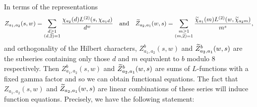     In terms of the representations
    \[
        Z_{a_{1},a_{2}}(s,w) = \sum_{\substack{d \ge 1 \\ (d,2) = 1}}\frac{\chi_{a_{2}}(d)L^{(2)}(s,\chi_{a_{1}d})}{d^{w}} \quad \text{and} \quad \widetilde{Z}_{a_{2},a_{1}}(w,s) = \sum_{\substack{m \ge 1 \\ (m,2) = 1}}\frac{\widetilde{\chi}_{a_{1}}(m)L^{(2)}(w,\widetilde{\chi}_{a_{2}m})}{m^{s}},
    \]
    and orthogonality of the Hilbert characters, $Z_{a_{1},a_{2}}^{b}(s,w)$ and $\widetilde{Z}_{a_{2},a_{1}}^{b}(w,s)$ are the subseries containing only those $d$ and $m$ equivalent to $b$ modulo $8$ respectively. Then $Z_{a_{1},a_{2}}^{b}(s,w)$ and $\widetilde{Z}_{a_{2},a_{1}}^{b}(w,s)$ are sums of $L$-functions with a fixed gamma factor and so we can obtain functional equations. The fact that $Z_{a_{1},a_{2}}(s,w)$ and $\widetilde{Z}_{a_{2},a_{1}}(w,s)$ are linear combinations of these series will induce function equations. Precisely, we have the following statement:

